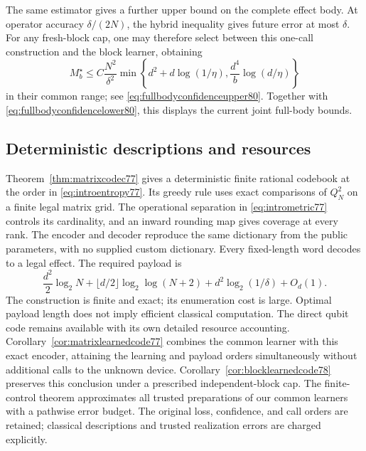 The same estimator gives a further upper bound on the complete effect
body.  At operator accuracy $\delta/(2N)$, the hybrid inequality gives
future error at most $\delta$.  For any fresh-block cap, one may
therefore select between this one-call construction and the block
learner, obtaining
\[
 M_b^\star\le C\frac{N^2}{\delta^2}
 \min\left\{d^2+d\log(1/\eta),\frac{d^4}{b}\log(d/\eta)\right\}
\]
in their common range; see \eqref{eq:fullbodyconfidenceupper80}.
Together with \eqref{eq:fullbodyconfidencelower80}, this displays
the current joint full-body bounds.

\subsection{Deterministic descriptions and resources}
Theorem~\ref{thm:matrixcodec77} gives a deterministic finite rational
codebook at the order in \eqref{eq:introentropy77}. Its greedy rule
uses exact comparisons of $Q_N^2$ on a finite legal matrix grid.
The operational separation in \eqref{eq:intrometric77} controls its
cardinality, and an inward rounding map gives coverage at every rank.
The encoder and decoder reproduce the same dictionary from the public
parameters, with no supplied custom dictionary. Every fixed-length
word decodes to a legal effect. The required payload is
\[
 \frac{d^2}{2}\log_2N+
 \lfloor d/2\rfloor\log_2\log(N+2)
             +d^2\log_2(1/\delta)+O_d(1).
\]
The construction is finite and exact; its enumeration cost is large.
Optimal payload length does not imply efficient classical computation.
The direct qubit code remains available with its own detailed resource
accounting. Corollary~\ref{cor:matrixlearnedcode77} combines the common
learner with this exact encoder, attaining the learning and payload
orders simultaneously without additional calls to the unknown device.
Corollary~\ref{cor:blocklearnedcode78} preserves this conclusion under
a prescribed independent-block cap.  The finite-control theorem
approximates all trusted preparations of our common learners with a
pathwise error budget.  The original loss, confidence, and call orders
are retained; classical descriptions and trusted realization errors
are charged explicitly.


